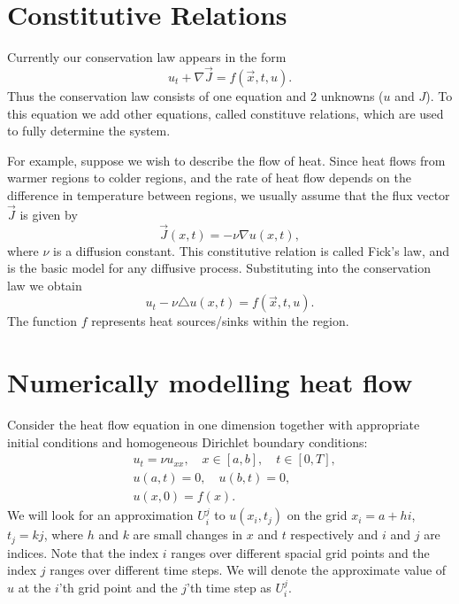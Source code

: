 \section*{Constitutive Relations}
Currently our conservation law appears in the form 
\[u_t + \nabla \vec{J} = f(\vec{x},t,u).\]
Thus the conservation law consists of one equation and 2 unknowns ($u$ and $J$).
To this equation we add other equations, called constituve relations, which are used to fully determine the system. 

For example, suppose we wish to describe the flow of heat.
Since heat flows from warmer regions to colder regions, and the rate of heat flow depends on the difference in temperature between regions, we usually assume that the flux vector $\vec{J}$ is given by 
\[\vec{J}(x,t) = -\nu \nabla u(x,t),\]
where $\nu$ is a diffusion constant.
This constitutive relation is called Fick's law, and is the basic model for any diffusive process.
Substituting into the conservation law we obtain 
\[u_t -\nu \triangle u(x,t) = f(\vec{x},t,u).\]  
The function $f$ represents heat sources/sinks within the region. 

\section*{Numerically modelling heat flow}
Consider the heat flow equation in one dimension together with appropriate initial conditions and homogeneous Dirichlet boundary conditions: 
\begin{align*}
	&{ } u_t = \nu u_{xx}, \quad x \in [a,b],\quad t \in [0,T], \\
	&{ } u(a,t) = 0,\quad u(b,t) = 0,\\
	&{ } u(x,0) = f(x).
\end{align*}
We will look for an approximation $U^j_i$ to $u(x_i,t_j)$ on the grid $x_i = a +  hi$, $t_j = kj$, where $h$ and $k$ are small changes in $x$ and $t$ respectively and $i$ and $j$ are indices.
Note that the index $i$ ranges over different spacial grid points and the index $j$ ranges over different time steps.
We will denote the approximate value of $u$ at the $i$'th grid point and the $j$'th time step as $U_i^j$.

